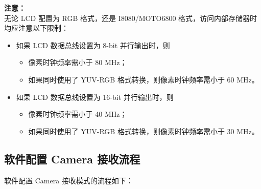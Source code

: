 \documentclass[main\_\_CN.tex]{subfiles}
\begin{document}
\textbf{注意：}\\
无论 LCD 配置为 RGB 格式，还是 I8080/MOTO6800 格式，访问内部存储器时均应注意以下限制：
\begin{itemize}
    \item 如果 LCD 数据总线设置为 8-bit 并行输出时，则
    \begin{itemize}
        \item 像素时钟频率需小于 80 MHz；
        \item 如果同时使用了 YUV-RGB 格式转换，则像素时钟频率需小于 60 MHz。
    \end{itemize}
    \item 如果 LCD 数据总线设置为 16-bit 并行输出时，则
    \begin{itemize}
        \item 像素时钟频率需小于 40 MHz；
        \item 如果同时使用了 YUV-RGB 格式转换，则像素时钟频率需小于 30 MHz。
    \end{itemize}
\end{itemize}




\subsection{软件配置 Camera 接收流程}
软件配置 Camera 接收模式的流程如下：
\end{document}
